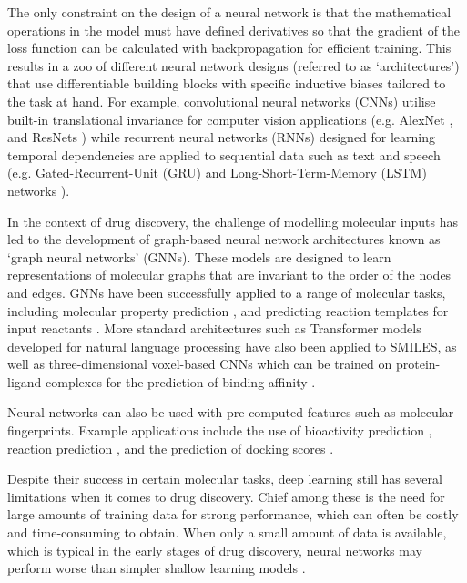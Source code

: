 The only constraint on the design of a neural network is that the mathematical operations in the model must have defined derivatives so that the gradient of the loss function can be calculated with backpropagation for efficient training. This results in a zoo of different neural network designs (referred to as `architectures') that use differentiable building blocks with specific inductive biases tailored to the task at hand. For example, convolutional neural networks (CNNs) utilise built-in translational invariance for computer vision applications (e.g. AlexNet \cite{Krizhevsky2012AlexNet}, and ResNets \cite{He2015ResNet}) while recurrent neural networks (RNNs) designed for learning temporal dependencies are applied to sequential data such as text \cite{Cho2014RNN} and speech \cite{Lipton2015RNN} (e.g. Gated-Recurrent-Unit (GRU) \cite{Chung2014GRU} and Long-Short-Term-Memory (LSTM) networks \cite{Hochreiter1997LSTM}). 

In the context of drug discovery, the challenge of modelling molecular inputs has led to the development of graph-based neural network architectures known as `graph neural networks' (GNNs). These models are designed to learn representations of molecular graphs that are invariant to the order of the nodes and edges. GNNs have been successfully applied to a range of molecular tasks, including molecular property prediction \cite{wu2017molnet, Gilmer17mpnn, Mayr2018compare, yang2019chemprop}, and predicting reaction templates for input reactants \cite{Coley19WLDN5}. More standard architectures such as Transformer models developed for natural language processing have also been applied to SMILES, as well as three-dimensional voxel-based CNNs which can be trained on protein-ligand complexes for the prediction of binding affinity \cite{Ragoza2017ProteinCNN, Imrie2018ProteinCNN, Jimenez2018Kdeep}.

Neural networks can also be used with pre-computed features such as molecular fingerprints. Example applications include the use of bioactivity prediction \cite{Bender2019}, reaction prediction \cite{Wei2016reactionprediction, segler2017neural}, and the prediction of docking scores \cite{Gentile2020deepdocking}.

Despite their success in certain molecular tasks, deep learning still has several limitations when it comes to drug discovery. Chief among these is the need for large amounts of training data for strong performance, which can often be costly and time-consuming to obtain. When only a small amount of data is available, which is typical in the early stages of drug discovery, neural networks may perform worse than simpler shallow learning models \cite{Jiang2021benchmark}. 

